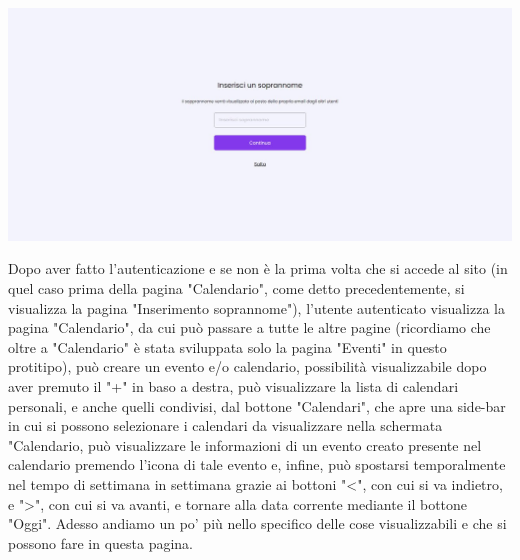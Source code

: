 \begin{center}
    \includegraphics[width=1\textwidth, height=0.3\textheight]{img/png/FrontEnd/InserimentoSoprannome.jpg}
\end{center}

Dopo aver fatto l'autenticazione e se non è la prima volta che si accede al sito (in quel caso prima della pagina "Calendario", come detto precedentemente, si visualizza la pagina "Inserimento soprannome"), l'utente autenticato visualizza la pagina "Calendario", da cui può passare a tutte le altre pagine (ricordiamo che oltre a "Calendario" è stata sviluppata solo la pagina "Eventi" in questo protitipo), può creare un evento  e/o calendario, possibilità visualizzabile dopo aver premuto il "+" in baso a destra, può visualizzare la lista di calendari personali, e anche quelli condivisi, dal bottone "Calendari", che apre una side-bar in cui si possono selezionare i calendari da visualizzare nella schermata "Calendario, può visualizzare le informazioni di un evento creato presente nel calendario premendo l'icona di tale evento e, infine, può spostarsi temporalmente nel tempo di settimana in settimana grazie ai bottoni "<", con cui si va indietro, e ">", con cui si va avanti, e tornare alla data corrente mediante il bottone "Oggi". Adesso andiamo un po' più nello specifico delle cose visualizzabili e che si possono fare in questa pagina.

